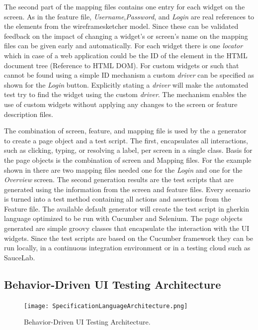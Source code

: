 \documentclass{sig-alternate-05-2015}
\begin{document}
{The second part of the mapping files contains one entry for each widget on the screen.
As in the feature file, \textit{Username},\textit{Password}, and \textit{Login} are real references to the elements from the wireframesketcher model.
Since these can be validated feedback on the impact of changing a widget's or screen's name on the mapping files can be given early and automatically.
For each widget there is one \textit{locator} which in case of a web application could be the ID of the element in the HTML document tree (Reference to HTML DOM).
For custom widgets or such that cannot be found using a simple ID mechanism a custom \textit{driver} can be specified as shown for the \textit{Login} button.
Explicitly stating a \textit{driver} will make the automated test try to find the widget using the custom \textit{driver}. 
The mechanism enables the use of custom widgets without applying any changes to the screen or feature description files.

The combination of screen, feature, and mapping file is used by the a generator to create a page object and a test script.
The first, encapsulates all interactions, such as clicking, typing, or resolving a label, per screen in a single class.
Basis for the page objects is the combination of screen and Mapping files.
For the example shown in  there are two mapping files needed one for the \textit{Login} and one for the \textit{Overview} screen.
The second generation results are the test scripts that are generated using the information from the screen and feature files.
Every scenario is turned into a test method containing all actions and assertions from the Feature file.
The available default generator will create the test script in gherkin language optimized to be run with Cucumber and Selenium.
The page objects generated are simple groovy classes that encapsulate the interaction with the UI widgets.
Since the test scripts are based on the Cucumber framework they can be run locally, in a continuous integration environment or in a testing cloud such as SauceLab.

\subsection{Behavior-Driven UI Testing Architecture}
\begin{figure}[h]
	\centering
	\texttt{[image: SpecificationLanguageArchitecture.png]}
	\caption{Behavior-Driven UI Testing Architecture.}
	\label{fig:architectureOverview}
\end{figure}

}
\end{document}
